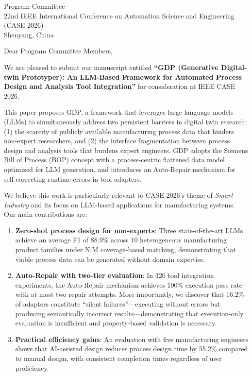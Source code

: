 \documentclass[11pt]{letter}
\begin{document}
\begin{letter}{Program Committee \\
22nd IEEE International Conference on Automation Science and Engineering (CASE 2026) \\
Shenyang, China}

\opening{Dear Program Committee Members,}

We are pleased to submit our manuscript entitled \textbf{``GDP (Generative Digital-twin Prototyper): An LLM-Based Framework for Automated Process Design and Analysis Tool Integration''} for consideration at IEEE CASE 2026.

This paper proposes GDP, a framework that leverages large language models (LLMs) to simultaneously address two persistent barriers in digital twin research: (1) the scarcity of publicly available manufacturing process data that hinders non-expert researchers, and (2) the interface fragmentation between process design and analysis tools that burdens expert engineers. GDP adopts the Siemens Bill of Process (BOP) concept with a process-centric flattened data model optimized for LLM generation, and introduces an Auto-Repair mechanism for self-correcting runtime errors in tool adapters.

We believe this work is particularly relevant to CASE 2026's theme of \textit{Smart Industry} and its focus on LLM-based applications for manufacturing systems. Our main contributions are:

\begin{enumerate}
\item \textbf{Zero-shot process design for non-experts}: Three state-of-the-art LLMs achieve an average F1 of 88.9\% across 10 heterogeneous manufacturing product families under N:M coverage-based matching, demonstrating that viable process data can be generated without domain expertise.

\item \textbf{Auto-Repair with two-tier evaluation}: In 320 tool integration experiments, the Auto-Repair mechanism achieves 100\% execution pass rate with at most two repair attempts. More importantly, we discover that 16.2\% of adapters constitute ``silent failures''---executing without errors but producing semantically incorrect results---demonstrating that execution-only evaluation is insufficient and property-based validation is necessary.

\item \textbf{Practical efficiency gains}: An evaluation with five manufacturing engineers shows that AI-assisted design reduces process design time by 55.2\% compared to manual design, with consistent completion times regardless of user proficiency.
\end{enumerate}


\end{letter}
\end{document}
